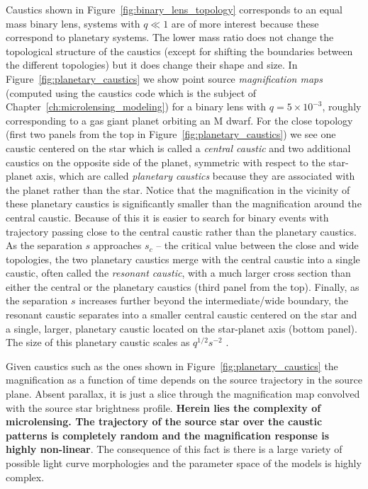 \documentclass[12pt,dvipsnames]{report}
\newcommand{\ssf}[1]{\textsf{#1}}
\begin{document}
Caustics shown in Figure~\ref{fig:binary_lens_topology} corresponds to an equal
mass binary lens, systems with $q\ll 1$ are of more interest because these
correspond to planetary systems. The lower mass ratio does not change the
topological structure of the caustics (except for shifting the boundaries
between the different topologies) but it does change their shape and size. In
Figure~\ref{fig:planetary_caustics} we show point source \emph{magnification
    maps} (computed using the \ssf{caustics} code which is the subject of
Chapter~\ref{ch:microlensing_modeling}) for a binary lens with $q=5\times
    10^{-3}$, roughly corresponding to a gas giant planet orbiting an M dwarf. For
the close topology (first two panels from the top in
Figure~\ref{fig:planetary_caustics}) we see one caustic centered on the star
which is called a \emph{central caustic} and two additional caustics on the
opposite side of the planet, symmetric with respect to the star-planet axis,
which are called \emph{planetary caustics} because they are associated with the
planet rather than the star. Notice that the magnification in the vicinity of
these planetary caustics is significantly smaller than the magnification around
the central caustic. Because of this it is easier to search for binary events
with trajectory passing close to the central caustic rather than the planetary
caustics. As the separation $s$ approaches $s_c$ -- the critical value between
the close and wide topologies, the two planetary caustics merge with the
central caustic into a single caustic, often called the \emph{resonant
    caustic}, with a much larger cross section than either the central or the
planetary caustics (third panel from the top). Finally, as the separation $s$
increases further beyond the intermediate/wide boundary, the resonant caustic
separates into a smaller central caustic centered on the star and a single,
larger, planetary caustic located on the star-planet axis (bottom panel). The
size of this planetary caustic scales as $q^{1/2}s^{-2}$ \citep[see references
    in review by][]{Gaudi2012}.

Given caustics such as the ones shown in Figure~\ref{fig:planetary_caustics}
the magnification as a function of time depends on the source trajectory in the
source plane. Absent parallax, it is just a slice through the magnification map
convolved with the source star brightness profile. \textbf{Herein lies the
    complexity of microlensing. The trajectory of the source star over the caustic
    patterns is completely random and the magnification response is highly
    non-linear}. The consequence of this fact is there is a large variety of
possible light curve morphologies and the parameter space of the models is
highly complex.
\end{document}
